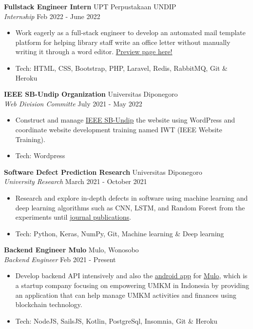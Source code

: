 \documentclass[a4paper]{article}
\begin{document}
\textbf{Fullstack Engineer Intern} \hfill UPT Perpustakaan UNDIP \\
\textit{Internship} \hfill Feb 2022 - June 2022\\
\vspace{-1mm}
\begin{itemize} \itemsep 1pt
	\item Work eagerly as a full-stack engineer to develop an automated mail template platform for helping library staff write an office letter without manually writing it through a word editor. \href{http://template-surat-testing.herokuapp.com/}{Preview page here!}
	\item Tech: HTML, CSS, Bootstrap, PHP, Laravel, Redis, RabbitMQ, Git \& Heroku
\end{itemize}

\textbf{IEEE SB-Undip Organization} \hfill Universitas Diponegoro\\
\textit{Web Division Committe} \hfill July 2021 - May 2022\\
\vspace{-1mm}
\begin{itemize} \itemsep 1pt
	\item Construct and manage \href{https://edu.ieee.org/id-undip/}{IEEE SB-Undip} the website using WordPress and coordinate website development training named IWT (IEEE Website Training).
	\item Tech: Wordpress
\end{itemize}

\textbf{Software Defect Prediction Research} \hfill Universitas Diponegoro\\
\textit{University Research} \hfill March 2021 - October 2021\\
\vspace{-1mm}
\begin{itemize} \itemsep 1pt
	\item Research and explore in-depth defects in software using machine learning and deep learning algorithms such as CNN, LSTM, and Random Forest from the experiments until
	\href{https://github.com/mhnaufal/Software-Defect-Finale/blob/main/reports/PAPER-Software%20Defect%20Prediction.pdf}{journal publications}.
	\item Tech: Python, Keras, NumPy, Git, Machine learning \& Deep learning
\end{itemize}

\textbf{Backend Engineer Mulo} \hfill Mulo, Wonosobo\\
\textit{Backend Engineer} \hfill Feb 2021 - Present\\
\vspace{-1mm}
\begin{itemize} \itemsep 1pt
	\item Develop backend API intensively and also the \href{https://play.google.com/store/apps/details?id=app.mulo}{android app} for \href{https://muloapp.id/}{Mulo}, which is a startup company focusing on empowering UMKM in Indonesia by providing an application that can help manage UMKM activities and finances using blockchain technology.
	\item Tech: NodeJS, SailsJS, Kotlin, PostgreSql, Insomnia, Git \& Heroku
\end{itemize}
\end{document}
